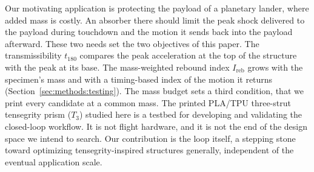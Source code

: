 \documentclass[lineno,nocopyright,upint,varvw,hyphenate]{asmejour}
\begin{document}
Our motivating application is protecting the payload of a planetary
lander, where added mass is costly. An absorber there should limit the
peak shock delivered to the payload during touchdown and the motion it
sends back into the payload afterward. These two needs set the two
objectives of this paper. The transmissibility $t_{180}$ compares the
peak acceleration at the top of the structure with the peak at its
base. The mass-weighted rebound index $I_{\mathrm{reb}}$ grows with the
specimen's mass and with a timing-based index of the motion it returns
(Section~\ref{sec:methods:testing}). The mass budget sets a third
condition, that we print every candidate at a common mass. The
printed PLA/TPU three-strut tensegrity prism ($T_3$) studied here is a testbed for developing
and validating the closed-loop workflow. It is not flight hardware, and
it is not the end of the design space we intend to search. Our
contribution is the loop itself, a stepping stone toward optimizing
tensegrity-inspired structures generally, independent of the eventual
application scale.
\end{document}
